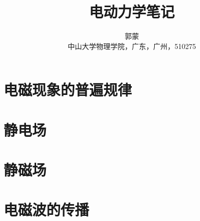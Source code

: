 \documentclass[10pt,oneside,UTF8]{book}
\title{\fontsize{30pt}{30pt}\textbf{电动力学笔记}}
\author
	{\kaishu 郭蒙 \\
	\kaishu 中山大学物理学院，广东，广州，510275} %
\date{}
\begin{document}
	\maketitle  %
\newpage
{}
\setcounter{page}{1}
\tableofcontents
\newpage
\setcounter{page}{1}
	\chapter{电磁现象的普遍规律}
		
	\chapter{静电场}

	\chapter{静磁场}
	\chapter{电磁波的传播}
		
\end{document}
